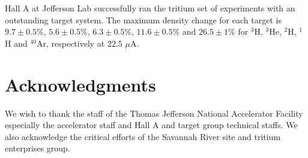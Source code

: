 \documentclass[final,5p,times,twocolumn]{elsarticle}
\begin{document}
Hall A at Jefferson Lab successfully ran the tritium set of experiments with an outstanding target system.  
The maximum density change for each target is $9.7 \pm 0.5 \%$, $5.6 \pm 0.5\% $, $6.3 \pm 0.5\% $, $11.6\pm 0.5\% $ 
and $26.5 \pm 1 \%$ for $^{3}$H, $^{3}$He, $^{2}$H, $^{1}$H and $^{40}$Ar, respectively at $22.5$ $\mu$A. 

\section{Acknowledgments}

We wish to thank the staff of the Thomas Jefferson National Accelerator Facility especially 
the accelerator staff and  Hall A and target group technical staffs. 
We also acknowledge the critical efforts of the Savannah River site and 
tritium enterprises group.

 

\end{document}
